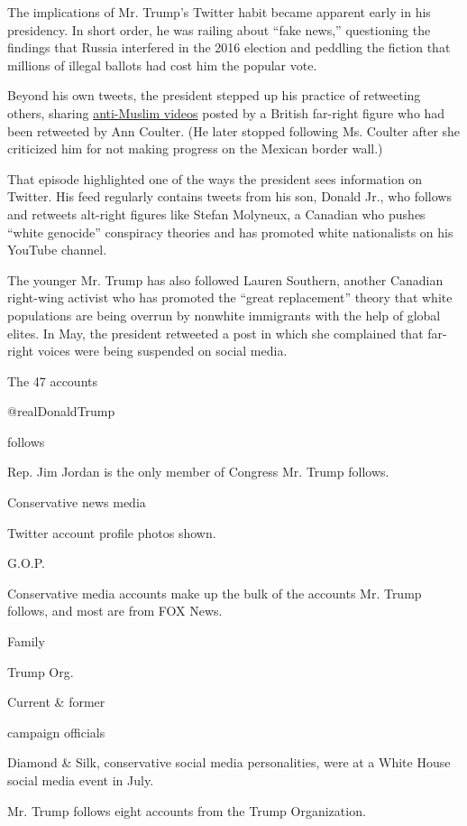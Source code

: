 The implications of Mr. Trump's Twitter habit became apparent early in
his presidency. In short order, he was railing about ``fake news,''
questioning the findings that Russia interfered in the 2016 election and
peddling the fiction that millions of illegal ballots had cost him the
popular vote.

Beyond his own tweets, the president stepped up his practice of
retweeting others, sharing
\href{https://www.nytimes.com/2017/11/29/us/politics/trump-anti-muslim-videos-jayda-fransen.html}{anti-Muslim
videos} posted by a British far-right figure who had been retweeted by
Ann Coulter. (He later stopped following Ms. Coulter after she
criticized him for not making progress on the Mexican border wall.)

That episode highlighted one of the ways the president sees information
on Twitter. His feed regularly contains tweets from his son, Donald Jr.,
who follows and retweets alt-right figures like Stefan Molyneux, a
Canadian who pushes ``white genocide'' conspiracy theories and has
promoted white nationalists on his YouTube channel.

The younger Mr. Trump has also followed Lauren Southern, another
Canadian right-wing activist who has promoted the ``great replacement''
theory that white populations are being overrun by nonwhite immigrants
with the help of global elites. In May, the president retweeted a post
in which she complained that far-right voices were being suspended on
social media.

The 47 accounts

@realDonaldTrump

follows

Rep. Jim Jordan is the only member of Congress Mr. Trump follows.

Conservative news media

Twitter account profile photos shown.

G.O.P.

Conservative media accounts make up the bulk of the accounts Mr. Trump
follows, and most are from FOX News.

Family

Trump Org.

Current \& former

campaign officials

Diamond \& Silk, conservative social media personalities, were at a
White House social media event in July.

Mr. Trump follows eight accounts from the Trump Organization.

